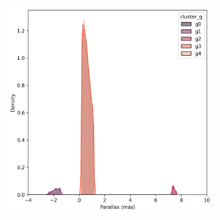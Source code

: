 \documentclass[11pt,a4paper,english,twocolumn]{article}
\begin{document}
\begin{figure}[!hbt]
\begin{subfigure}{0.3\textwidth}
  \end{subfigure}
  \begin{subfigure}{0.3\textwidth}
    \includegraphics[width=\textwidth]{../figures/melotte_22/dec_parallax_filtered_melotte_22.png}
  \end{subfigure}


\end{figure}
\end{document}
